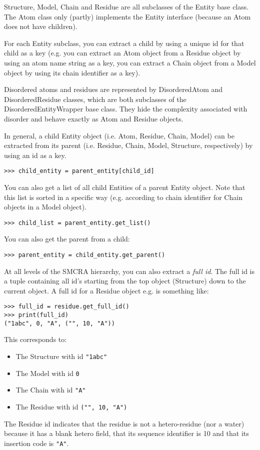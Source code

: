 Structure, Model, Chain and Residue are all subclasses of the Entity base class.
The Atom class only (partly) implements the Entity interface (because an Atom
does not have children).

For each Entity subclass, you can extract a child by using a unique id for that
child as a key (e.g. you can extract an Atom object from a Residue object by
using an atom name string as a key, you can extract a Chain object from a Model
object by using its chain identifier as a key).

Disordered atoms and residues are represented by DisorderedAtom and DisorderedResidue
classes, which are both subclasses of the DisorderedEntityWrapper base class.
They hide the complexity associated with disorder and behave exactly as Atom
and Residue objects.

In general, a child Entity object (i.e. Atom, Residue, Chain, Model) can be
extracted from its parent (i.e. Residue, Chain, Model, Structure, respectively)
by using an id as a key.

\begin{verbatim}
>>> child_entity = parent_entity[child_id]
\end{verbatim}

You can also get a list of all child Entities of a parent Entity object. Note
that this list is sorted in a specific way (e.g. according to chain identifier
for Chain objects in a Model object).

\begin{verbatim}
>>> child_list = parent_entity.get_list()
\end{verbatim}

You can also get the parent from a child:
\begin{verbatim}
>>> parent_entity = child_entity.get_parent()
\end{verbatim}

At all levels of the SMCRA hierarchy, you can also extract a \emph{full id}.
The full id is a tuple containing all id's starting from the top object (Structure)
down to the current object. A full id for a Residue object e.g. is something
like:

\begin{verbatim}
>>> full_id = residue.get_full_id()
>>> print(full_id)
("1abc", 0, "A", ("", 10, "A"))
\end{verbatim}

This corresponds to:

\begin{itemize}
\item The Structure with id \verb|"1abc"|
\item The Model with id \verb|0|
\item The Chain with id \verb|"A"|
\item The Residue with id \verb|("", 10, "A")|
\end{itemize}
The Residue id indicates that the residue is not a hetero-residue (nor a water)
because it has a blank hetero field, that its sequence identifier is 10 and
that its insertion code is \verb|"A"|.

